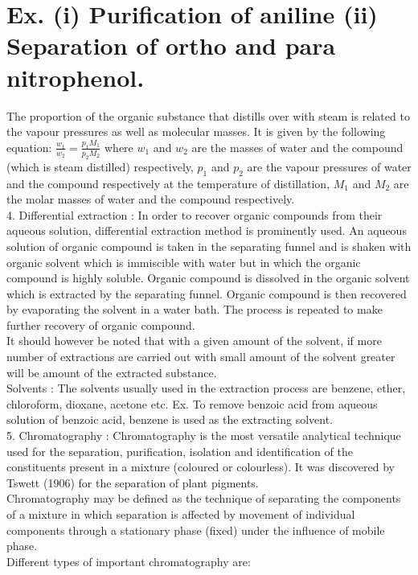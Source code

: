 \documentclass[10pt]{article}
\begin{document}
\section*{Ex. (i) Purification of aniline (ii) Separation of ortho and para nitrophenol.}
The proportion of the organic substance that distills over with steam is related to the vapour pressures as well as molecular masses. It is given by the following equation: $\frac{w_{1}}{w_{2}}=\frac{p_{1} M_{1}}{p_{2} M_{2}}$ where $w_{1}$ and $w_{2}$ are the masses of water and the compound (which is steam distilled) respectively, $p_{1}$ and $p_{2}$ are the vapour pressures of water and the compound respectively at the temperature of distillation, $M_{1}$ and $M_{2}$ are the molar masses of water and the compound respectively.\\
4. Differential extraction : In order to recover organic compounds from their aqueous solution, differential extraction method is prominently used. An aqueous solution of organic compound is taken in the separating funnel and is shaken with organic solvent which is immiscible with water but in which the organic compound is highly soluble. Organic compound is dissolved in the organic solvent which is extracted by the separating funnel. Organic compound is then recovered by evaporating the solvent in a water bath. The process is repeated to make further recovery of organic compound.\\
It should however be noted that with a given amount of the solvent, if more number of extractions are carried out with small amount of the solvent greater will be amount of the extracted substance.\\
Solvents : The solvents usually used in the extraction process are benzene, ether, chloroform, dioxane, acetone etc. Ex. To remove benzoic acid from aqueous solution of benzoic acid, benzene is used as the extracting solvent.\\
5. Chromatography : Chromatography is the most versatile analytical technique used for the separation, purification, isolation and identification of the constituents present in a mixture (coloured or colourless). It was discovered by Tswett (1906) for the separation of plant pigments.\\
Chromatography may be defined as the technique of separating the components of a mixture in which separation is affected by movement of individual components through a stationary phase (fixed) under the influence of mobile phase.\\
Different types of important chromatography are:
\end{document}
